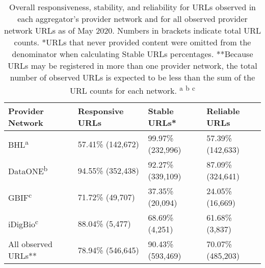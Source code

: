 \begin{table}[t!]
\begin{adjustwidth}{0in}{0in} %
\centering
\begin{tabular}{llll}
\hline
{\bf Provider Network} & {\bf Responsive URLs} & {\bf Stable URLs*} & {\bf Reliable URLs} \\ \hline
BHL\textsuperscript{a} & 57.41\% (142,672) & 99.97\% (232,996) & 57.39\% (142,633) \\
DataONE\textsuperscript{b} & 94.55\% (352,438) & 92.27\% (339,109) & 87.09\% (324,641) \\
GBIF\textsuperscript{c} & 71.72\% (49,707) & 37.35\% (20,094) & 24.05\% (16,669) \\
iDigBio\textsuperscript{c} & 88.04\% (5,477) & 68.69\% (4,251) & 61.68\% (3,837)  \\
All observed URLs** & 78.94\% (546,645) & 90.43\% (593,469) & 70.07\% (485,203) \\ \hline
\end{tabular}
\caption{Overall responsiveness, stability, and reliability for URLs observed in each aggregator's provider network and for all observed provider network URLs as of May 2020. Numbers in brackets indicate total URL counts.
*URLs that never provided content were omitted from the denominator when calculating Stable URLs percentages.
**Because URLs may be registered in more than one provider network, the total number of observed URLs is expected to be less than the sum of the URL counts for each network.
\textsuperscript{a}\citet{poelen_jorrit_h_2019_3484555}
\textsuperscript{b}\citet{poelen_jorrit_h_2019_3483218}
\textsuperscript{c}\citet{poelen_jorrit_h_2019_3484205}
}
\label{table1}
\end{adjustwidth}
\end{table}
